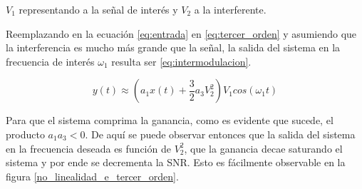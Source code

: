 \documentclass[12pt]{report}
\begin{document}
\(V_1\) representando a la señal de interés y \(V_2\) a la interferente.\par
Reemplazando en la ecuación \ref{eq:entrada} en \ref{eq:tercer_orden} y asumiendo que la interferencia es mucho más grande que la señal, 
la salida del sistema en la frecuencia de interés \(\omega_1\) resulta ser \ref{eq:intermodulacion}.

\begin{equation}\label{eq:intermodulacion}
    y(t) \approx \left( a_1 x(t) + \frac{3}{2} a_3 V_2^{2} \right) V_1  cos(\omega_1 t)
\end{equation}

Para que el sistema comprima la ganancia, como es evidente que sucede, el producto \(a_1 a_3 < 0\). De aquí se puede observar entonces que
la salida del sistema en la frecuencia deseada es función de \(V_2^{2}\), que la ganancia decae saturando el sistema y por ende se decrementa 
la SNR. Esto es fácilmente observable en la figura \ref{no_linealidad_e_tercer_orden}.
\end{document}
